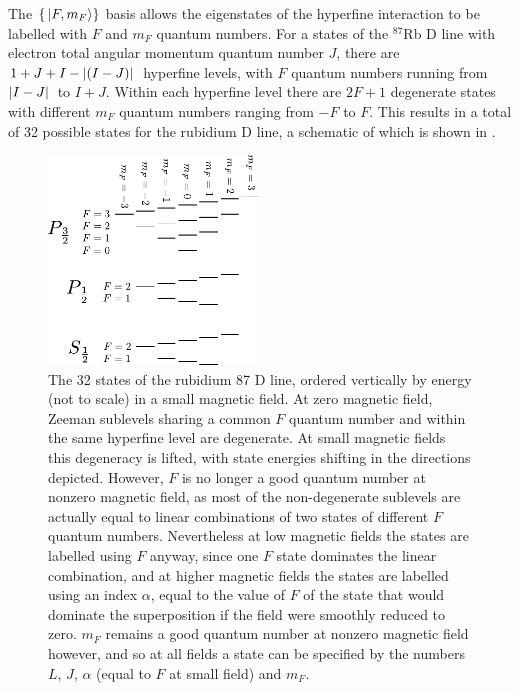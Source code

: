 The $\{\ket{F, m_F}\}$ basis allows the eigenstates of the hyperfine interaction to be labelled with $F$ and $m_F$ quantum numbers. For a states of the $^{87}$Rb D line with electron total angular momentum quantum number $J$, there are $1+J+I - \abs{(I - J)}$ hyperfine levels, with $F$ quantum numbers running from $\abs{I - J}$ to $I + J$. Within each hyperfine level there are $2F + 1$ degenerate states with different $m_F$ quantum numbers ranging from $-F$ to $F$. This results in a total of 32 possible states for the rubidium D line, a schematic of which is shown in .

\begin{figure}%
\begin{center}
\includegraphics[width=0.5\textwidth]{figures/atomic_physics/D_line.pdf}
\caption{The 32 states of the rubidium 87 D line, ordered vertically by energy (not to scale) in a small magnetic field. At zero magnetic field, Zeeman sublevels sharing a common $F$ quantum number and within the same hyperfine level are degenerate. At small magnetic fields this degeneracy is lifted, with state energies shifting in the directions depicted. However, $F$ is no longer a good quantum number at nonzero magnetic field, as most of the non-degenerate sublevels are actually equal to linear combinations of two states of different $F$ quantum numbers. Nevertheless at low magnetic fields the states are labelled using $F$ anyway, since one $F$ state dominates the linear combination, and at higher magnetic fields the states are labelled using an index $\alpha$, equal to the value of $F$ of the state that would dominate the superposition if the field were smoothly reduced to zero. $m_F$ remains a good quantum number at nonzero magnetic field however, and so at all fields a state can be specified by the numbers $L$, $J$, $\alpha$ (equal to $F$ at small field) and $m_F$.} \label{fig:D_line}
\end{center}
\end{figure}


